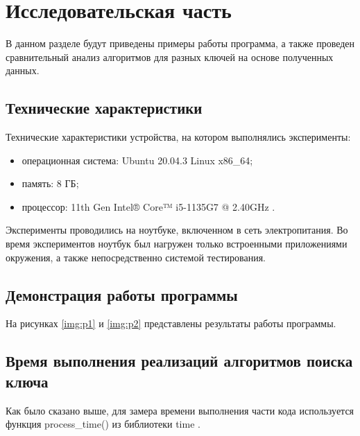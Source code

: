 \chapter{Исследовательская часть}
В данном разделе будут приведены примеры работы программа, а также
проведен сравнительный анализ алгоритмов для разных ключей на основе полученных данных.

\section{Технические характеристики}



Технические характеристики устройства, на котором выполнялись эксперименты:



\begin{itemize}

	
	\item операционная система: Ubuntu 20.04.3 \cite{ubuntu} Linux \cite{linux} x86\_64;

	
	\item память: 8 ГБ;

	
	\item процессор: 11th Gen Intel® Core™ i5-1135G7 @ 2.40GHz \cite{intel}.

	
\end{itemize}


Эксперименты проводились на ноутбуке, включенном в сеть электропитания. Во время экспериментов ноутбук был нагружен только встроенными приложениями окружения, а также непосредственно системой тестирования.


\section{Демонстрация работы программы}

На рисунках \ref{img:p1} и \ref{img:p2} представлены результаты работы программы.

\clearpage

\section{Время выполнения реализаций алгоритмов поиска ключа}
Как было сказано выше, для замера времени выполнения части кода используется функция process\_time() из библиотеки time \cite{pythonlangtime}. 

